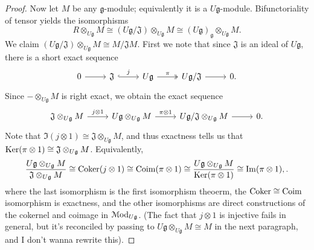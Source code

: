 \begin{proof}
	Now let $M$ be any $\mathfrak{g} $-module; equivalently it is a $U\mathfrak{g} $-module. Bifunctoriality of tensor yields the isomorphisms
	\[
		R\otimes _{U\mathfrak{g} } M \cong (U\mathfrak{g} /\mathfrak{J} )\otimes _{U\mathfrak{g} } M \cong (U\mathfrak{g} )_\mathfrak{g} \otimes _{U\mathfrak{g} } M
	.\]
	We claim $(U\mathfrak{g} /\mathfrak{J} )\otimes_{U\mathfrak{g} } M \cong M/\mathfrak{J} M$. First we note that since $\mathfrak{J} $ is an ideal of $U\mathfrak{g} $, there is a short exact sequence
	\[\begin{tikzcd}[row sep = 2.5em, column sep = 2.5em]
	0\ar[r]  & \mathfrak{J} \ar[" j ", hook, r]  & U\mathfrak{g} \ar[" \pi  ", two heads, r]  & U\mathfrak{g} /\mathfrak{J} \ar[r]  & 0.
	\end{tikzcd}\]
	Since $-\otimes _{U\mathfrak{g} } M$ is right exact, we obtain the exact sequence
	\[\begin{tikzcd}[row sep = 2.5em, column sep = 2.5em]
	\mathfrak{J} \otimes_{U\mathfrak{g} } M\ar[" j\otimes1 ", r]  & U\mathfrak{g} \otimes _{U\mathfrak{g} } M\ar[" \pi \otimes 1 ", r]  & U\mathfrak{g} /\mathfrak{J} \otimes _{U\mathfrak{g} } M\ar[r]  & 0.
	\end{tikzcd}\]
	Note that $\Im (j\otimes 1) \cong \mathfrak{J} \otimes_{U\mathfrak{g} }M$, and thus exactness tells us that $\operatorname{Ker} (\pi \otimes 1) \cong \mathfrak{J} \otimes_{U\mathfrak{g} } M$. Equivalently,
	\[
	\frac{U\mathfrak{g} \otimes _{U\mathfrak{g} } M}{\mathfrak{J} \otimes _{U\mathfrak{g} } M} \cong \operatorname{Coker}(j\otimes 1) \cong \operatorname{Coim}(\pi \otimes 1) \cong \frac{U\mathfrak{g} \otimes _{U\mathfrak{g} } M}{\operatorname{Ker} (\pi \otimes 1)} \cong \operatorname{Im} (\pi \otimes 1),
	.\]
	where the last isomorphism is the first isomorphism theoerm, the $\operatorname{Coker} \cong \operatorname{Coim}$ isomorphism is exactness, and the other isomorphisms are direct constructions of the cokernel and coimage in $\mathcal{M}\mathrm{od}_{U\mathfrak{g}} $. (The fact that $j\otimes 1$ is injective fails in general, but it's reconciled by passing to $U\mathfrak{g} \otimes _{U\mathfrak{g} } M\cong M$ in the next paragraph, and I don't wanna rewrite this).


\end{proof}
